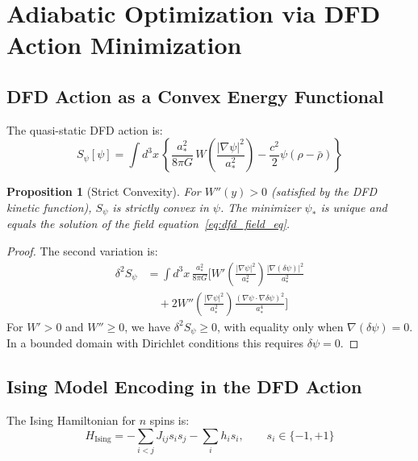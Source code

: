 \documentclass[11pt]{article}
\newtheorem{proposition}[theorem]{Proposition}
\theoremstyle{definition}
\theoremstyle{remark}
\begin{document}
\section{Adiabatic Optimization via DFD Action Minimization}
\label{sec:adiabatic_opt}

\subsection{DFD Action as a Convex Energy Functional}

The quasi-static DFD action is:
\begin{equation}
S_\psi[\psi] = \int d^3x\,\left\{
\frac{a_*^2}{8\pi G}\,W\!\left(\frac{|\nabla\psi|^2}{a_*^2}\right)
- \frac{c^2}{2}\psi(\rho - \bar\rho)
\right\}
\label{eq:dfd_action}
\end{equation}

\begin{proposition}[Strict Convexity]
For $W''(y) > 0$ (satisfied by the DFD kinetic function), $S_\psi$ is
strictly convex in $\psi$. The minimizer $\psi_*$ is unique and equals
the solution of the field equation~\eqref{eq:dfd_field_eq}.
\end{proposition}

\begin{proof}
The second variation is:
\begin{align}
\delta^2 S_\psi &= \int d^3x\,\frac{a_*^2}{8\pi G}\Bigg[
W'\!\left(\frac{|\nabla\psi|^2}{a_*^2}\right)
\frac{|\nabla(\delta\psi)|^2}{a_*^2}
\nonumber\\
&\quad + 2W''\!\left(\frac{|\nabla\psi|^2}{a_*^2}\right)
\frac{(\nabla\psi\cdot\nabla\delta\psi)^2}{a_*^4}
\Bigg]
\end{align}
For $W' > 0$ and $W'' \geq 0$, we have $\delta^2 S_\psi \geq 0$, with
equality only when $\nabla(\delta\psi) = 0$. In a bounded domain with
Dirichlet conditions this requires $\delta\psi = 0$.
\end{proof}

\subsection{Ising Model Encoding in the DFD Action}
\label{sec:ising_encoding}

The Ising Hamiltonian for $n$ spins is:
\begin{equation}
H_{\mathrm{Ising}} = -\sum_{i<j} J_{ij} s_i s_j - \sum_i h_i s_i,
\qquad s_i \in \{-1, +1\}
\label{eq:ising}
\end{equation}
\end{document}
